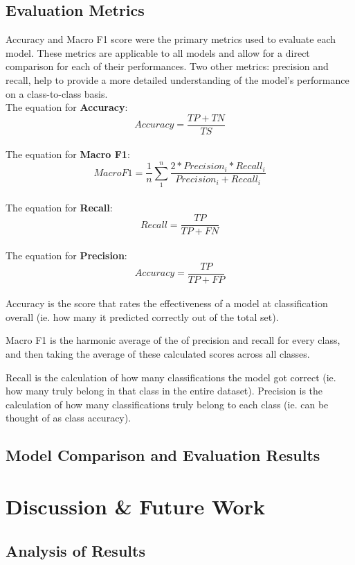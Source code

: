 \documentclass[10pt,sigconf,letterpaper,nonacm]{acmart}
\begin{document}
\subsection{Evaluation Metrics}
Accuracy and Macro F1 score were the primary metrics used to evaluate each model. These metrics are applicable to all models and allow for
a direct comparison for each of their performances. Two other metrics: precision and recall, help to provide a more detailed understanding of the model's performance on a class-to-class basis.
\newline \\
The equation for \textbf{Accuracy}: \\
\[
Accuracy= \frac{TP + TN}{TS}
\]
\newline \\
The equation for \textbf{Macro F1}: \\
\[
Macro F 1= \frac{1}{n} \sum_{1}^{n} \frac{2*Precision_i*Recall_i}{Precision_i+Recall_i}
\]
\newline \\
The equation for \textbf{Recall}: \\
\[
Recall= \frac{TP}{TP + FN}
\]
\newline \\
The equation for \textbf{Precision}: \\
\[
Accuracy= \frac{TP}{TP + FP}
\]
\\
Accuracy is the score that rates the effectiveness of a model at classification overall (ie. how many it predicted correctly out of the total set). 

Macro F1 is the harmonic average of the of precision and recall for every class, and then taking the average of these calculated scores across all classes.

Recall is the calculation of how many classifications the model got correct (ie. how many truly belong in that class in the entire dataset). 
Precision is the calculation of how many classifications truly belong to each class (ie. can be thought of as class accuracy).


\subsection{Model Comparison and Evaluation Results}


\section{Discussion \& Future Work}
\subsection{Analysis of Results}
\end{document}
